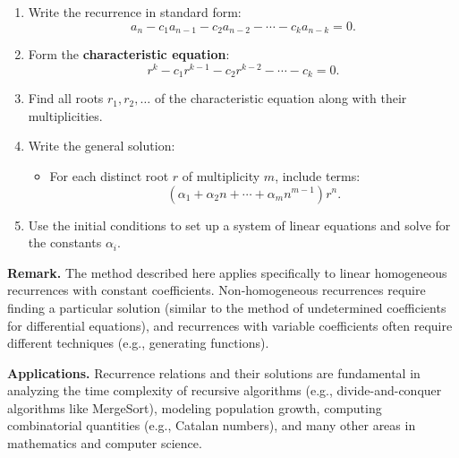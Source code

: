 \documentclass[11pt,a4paper]{article}
\begin{document}
\begin{enumerate}[label=\textbf{Step \arabic*:}]
    \item Write the recurrence in standard form:
    \begin{equation*}
        a_n - c_1 a_{n-1} - c_2 a_{n-2} - \cdots - c_k a_{n-k} = 0.
    \end{equation*}
    \item Form the \textbf{characteristic equation}:
    \begin{equation*}
        r^k - c_1 r^{k-1} - c_2 r^{k-2} - \cdots - c_k = 0.
    \end{equation*}
    \item Find all roots $r_1, r_2, \dots$ of the characteristic equation along with their multiplicities.
    \item Write the general solution:
    \begin{itemize}
        \item For each distinct root $r$ of multiplicity $m$, include terms:
        \begin{equation*}
            (\alpha_1 + \alpha_2 n + \cdots + \alpha_m n^{m-1}) r^n.
        \end{equation*}
    \end{itemize}
    \item Use the initial conditions to set up a system of linear equations and solve for the constants $\alpha_i$.
\end{enumerate}

\textbf{Remark.} The method described here applies specifically to linear homogeneous recurrences with constant coefficients. Non-homogeneous recurrences require finding a particular solution (similar to the method of undetermined coefficients for differential equations), and recurrences with variable coefficients often require different techniques (e.g., generating functions).

\textbf{Applications.} Recurrence relations and their solutions are fundamental in analyzing the time complexity of recursive algorithms (e.g., divide-and-conquer algorithms like MergeSort), modeling population growth, computing combinatorial quantities (e.g., Catalan numbers), and many other areas in mathematics and computer science.
\end{document}
